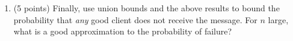 \documentclass[11pt]{article}
\begin{document}
\begin{enumerate}
\begin{enumerate}
 \ \\ \ \\ \ \\ \ \\ \ \\ \ \\ \ \\ \ \\

\pagebreak

\item (5 points) Finally, use union bounds and the above results to bound the probability that \emph{any} good client does not receive the message.  For $n$ large, what is a good approximation to the probability of failure?



\end{enumerate}


 
 
 
 
\end{enumerate}
\end{document}
